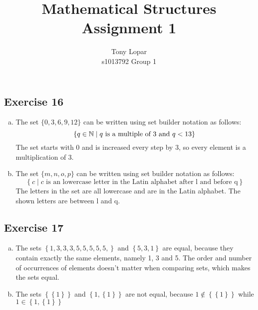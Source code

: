\documentclass[a4paper]{article}
\title{Mathematical Structures\\Assignment 1}
\author{Tony Lopar \\ s1013792 \quad Group 1}
\newcommand{\exerciseenum}[2]{\subsection*{Exercise #1}{\begin{enumerate}[a)]#2\end{enumerate}}}
\newcommand{\set}[1]{\ensuremath{\left\{{#1}\right\}}}
\newcommand{\setbuild}[2]{\ensuremath{\set{{#1}\mid{#2}}}}
\newcommand{\NN}{\ensuremath{\mathbb{N}}}
\begin{document}
\maketitle


\exerciseenum{16}{%
\item%
The set $\{0,3,6,9,12\}$
can be written using set builder notation as follows:
\[
\setbuild{q\in \NN}{q \mbox{~is a multiple of 3 and $q < 13$} } \\
\]
The set starts with 0 and is increased every step by 3, so every element is a multiplication of 3.


\addtocounter{enumi}{1}
\item%
The set $\{m,n,o,p\}$
can be written using set builder notation as follows:
\[
\setbuild{c}{c \mbox{~is an lowercase letter in the Latin alphabet after l and before q}}
\]
The letters in the set are all lowercase and are in the Latin alphabet. The shown letters are between l and q.

}

\exerciseenum{17}{%
\item%
The sets $\set{1,3,3,3,5,5,5,5,5,}$ and $\set{5,3,1}$ are equal,
because they contain exactly the same elements, namely 1, 3 and 5. The order and number of occurrences of elements doesn't matter when comparing sets, which makes the sets equal.
\item%
The sets $\set{\set{1}}$ and $\set{1,\set{1}}$ are not equal,
because $1 \notin \set{\set{1}}$ while $1 \in \set{1,\set{1}}$
}
\end{document}
